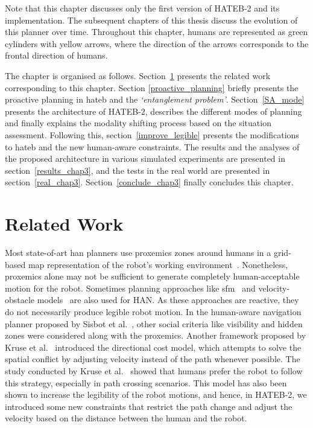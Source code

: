 Note that this chapter discusses only the first version of HATEB-2 and its implementation. The subsequent chapters of this thesis discuss the evolution of this planner over time. Throughout this chapter, humans are represented as green cylinders with yellow arrows, where the direction of the arrows corresponds to the frontal direction of humans. 

The chapter is organised as follows. Section~\ref{chap3_related_work} presents the related work corresponding to this chapter. Section \ref{proactive_planning} briefly presents the proactive planning in \acrshort{hateb} and the \textit{`entanglement problem'}. Section~\ref{SA_mode} presents the architecture of HATEB-2, describes the different modes of planning and finally explains the modality shifting process based on the situation assessment. Following this, section~\ref{improve_legible} presents the modifications to \acrshort{hateb} and the new human-aware constraints. The results and the analyses of the proposed architecture in various simulated experiments are presented in section~\ref{results_chap3}, and the tests in the real world are presented in section~\ref{real_chap3}. Section~\ref{conclude_chap3} finally concludes this chapter.

\section{Related Work}\label{chap3_related_work}
Most state-of-art \acrshort{han} planners use proxemics zones around humans in a grid-based map representation of the robot's working environment~\cite{kruse_ras_2013}. Nonetheless, proxemics alone may not be sufficient to generate completely human-acceptable motion for the robot. Sometimes planning approaches like \acrshort{sfm}~\cite{helbing1995social, ferrer2013robot} and velocity-obstacle models~\cite{snape2011hybrid, berg2011reciprocal} are also used for HAN. As these approaches are reactive, they do not necessarily produce legible robot motion. In the human-aware navigation planner proposed by Sisbot et al.~\cite{sisbot_tr_2007}, other social criteria like visibility and hidden zones were considered along with the proxemics. Another framework proposed by Kruse et al.~\cite{kruse_arso_2012} introduced the directional cost model, which attempts to solve the spatial conflict by adjusting velocity instead of the path whenever possible. The study conducted by Kruse et al.~\cite{kruse2014evaluating} showed that humans prefer the robot to follow this strategy, especially in path crossing scenarios. This model has also been shown to increase the legibility of the robot motions, and hence, in HATEB-2, we introduced some new constraints that restrict the path change and adjust the velocity based on the distance between the human and the robot. 

